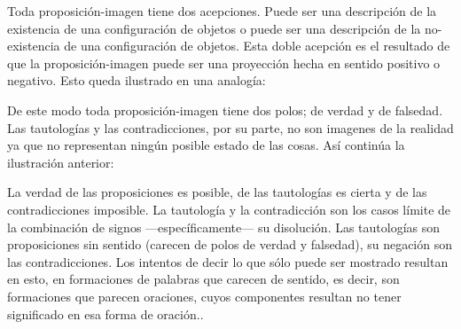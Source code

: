     Toda proposición-imagen tiene dos acepciones. Puede ser una descripción de
    la existencia de una configuración de objetos o puede ser una descripción de la
    no-existencia de una configuración de objetos.\autocite[cf.~][p.~72]{IWT} 
    Esta doble acepción es el resultado de que la proposición-imagen puede ser una
    proyección hecha en sentido positivo o negativo.\autocite[cf.~][p.~74]{IWT} Esto
    queda ilustrado en una analogía:


    De este modo toda proposición-imagen tiene dos polos; de verdad y de falsedad.
    Las tautologías y las contradicciones, por su parte, no son imagenes de la
    realidad ya que no representan ningún posible estado de las cosas. Así continúa
    la ilustración anterior:


    La verdad de las proposiciones es posible, de las tautologías es cierta y de las
    contradicciones imposible. La tautología y la contradicción son los casos límite
    de la combinación de signos ---específicamente--- su
    disolución.\autocite[cf.~][4.464 y 4.466]{tractatus} Las tautologías son
    proposiciones sin sentido (carecen de polos de verdad y falsedad), su negación son
    las contradicciones. Los intentos de decir lo que sólo puede ser mostrado
    resultan en esto, en formaciones de palabras que carecen de sentido, es decir,
    son formaciones que parecen oraciones, cuyos componentes resultan no tener
    significado en esa forma de oración.\autocite[cf.~][p.~163~\S2]{IWT}.

